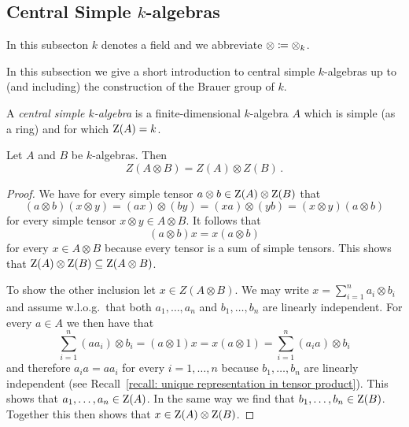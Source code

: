 \subsection{Central Simple \texorpdfstring{$k$}{k}-algebras}


\begin{conventions}
  In this subsecton $k$ denotes a field and we abbreviate $\otimes \coloneqq \otimes_k$.
\end{conventions}


\begin{fluff}
  In this subsection we give a short introduction to central simple $k$-algebras up to (and including) the construction of the Brauer group of $k$.
\end{fluff}


\begin{definition}
  A \emph{central simple $k$-algebra} is a finite-dimensional $k$-algebra $A$ which is simple (as a ring) and for which $\operatorname{Z}(A) = k$.
\end{definition}


\begin{lemma}
  \label{lemma: center of tensor product}
  Let $A$ and $B$ be $k$-algebras.
  Then
  \[
      Z(A \otimes B)
    = Z(A) \otimes Z(B) \,.
  \]
\end{lemma}


\begin{proof}
  We have for every simple tensor $a \otimes b \in \operatorname{Z}(A) \otimes \operatorname{Z}(B)$ that
  \[
      (a \otimes b) (x \otimes y)
    = (ax) \otimes (by)
    = (xa) \otimes (yb)
    = (x \otimes y)(a \otimes b)
  \]
  for every simple tensor $x \otimes y \in A \otimes B$.
  It follows that
  \[
      (a \otimes b) x
    = x (a \otimes b)
  \]
  for every $x \in A \otimes B$ because every tensor is a sum of simple tensors.
  This shows that $\operatorname{Z}(A) \otimes \operatorname{Z}(B) \subseteq \operatorname{Z}(A \otimes B)$.
  
  To show the other inclusion let $x \in Z(A \otimes B)$.
  We may write $x = \sum_{i=1}^n a_i \otimes b_i$ and assume w.l.o.g.\ that both $a_1, \dotsc, a_n$ and $b_1, \dotsc, b_n$ are linearly independent.
  For every $a \in A$ we then have that
  \[
      \sum_{i=1}^n (a a_i) \otimes b_i
    = (a \otimes 1) x
    = x (a \otimes 1)
    = \sum_{i=1}^n (a_i a) \otimes b_i
  \]
  and therefore $a_i a = a a_i$ for every $i = 1, \dotsc, n$ because $b_1, \dotsc, b_n$ are linearly independent (see Recall~\ref{recall: unique representation in tensor product}).
  This shows that $a_1, \dotsc, a_n \in \operatorname{Z}(A)$.
  In the same way we find that $b_1, \dotsc, b_n \in \operatorname{Z}(B)$.
  Together this then shows that $x \in \operatorname{Z}(A) \otimes \operatorname{Z}(B)$.
\end{proof}


